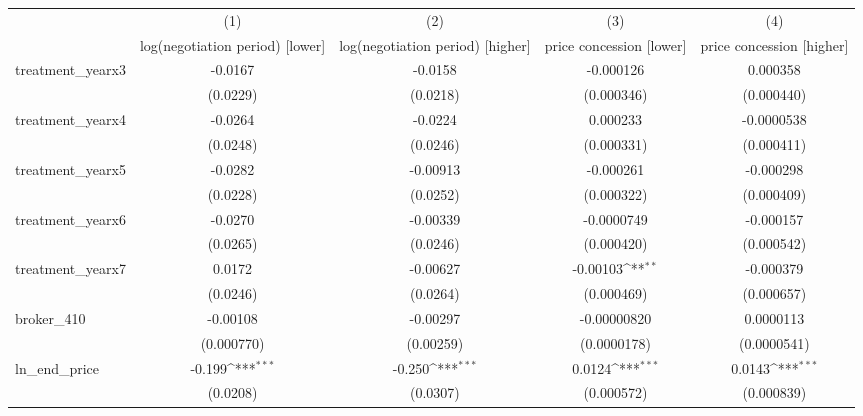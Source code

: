 {
\def\sym#1{\ifmmode^{#1}\else\(^{#1}\)\fi}
\begin{tabular}{l*{4}{c}}
\toprule
            &\multicolumn{1}{c}{(1)}&\multicolumn{1}{c}{(2)}&\multicolumn{1}{c}{(3)}&\multicolumn{1}{c}{(4)}\\
            &\multicolumn{1}{c}{log(negotiation period) [lower]}&\multicolumn{1}{c}{log(negotiation period) [higher]}&\multicolumn{1}{c}{price concession [lower]}&\multicolumn{1}{c}{price concession [higher]}\\
\midrule
treatment\_yearx3&     -0.0167         &     -0.0158         &   -0.000126         &    0.000358         \\
            &    (0.0229)         &    (0.0218)         &  (0.000346)         &  (0.000440)         \\
\addlinespace
treatment\_yearx4&     -0.0264         &     -0.0224         &    0.000233         &  -0.0000538         \\
            &    (0.0248)         &    (0.0246)         &  (0.000331)         &  (0.000411)         \\
\addlinespace
treatment\_yearx5&     -0.0282         &    -0.00913         &   -0.000261         &   -0.000298         \\
            &    (0.0228)         &    (0.0252)         &  (0.000322)         &  (0.000409)         \\
\addlinespace
treatment\_yearx6&     -0.0270         &    -0.00339         &  -0.0000749         &   -0.000157         \\
            &    (0.0265)         &    (0.0246)         &  (0.000420)         &  (0.000542)         \\
\addlinespace
treatment\_yearx7&      0.0172         &    -0.00627         &    -0.00103\sym{**} &   -0.000379         \\
            &    (0.0246)         &    (0.0264)         &  (0.000469)         &  (0.000657)         \\
\addlinespace
broker\_410  &    -0.00108         &    -0.00297         & -0.00000820         &   0.0000113         \\
            &  (0.000770)         &   (0.00259)         & (0.0000178)         & (0.0000541)         \\
\addlinespace
ln\_end\_price&      -0.199\sym{***}&      -0.250\sym{***}&      0.0124\sym{***}&      0.0143\sym{***}\\
            &    (0.0208)         &    (0.0307)         &  (0.000572)         &  (0.000839)         \\

\end{tabular}}
